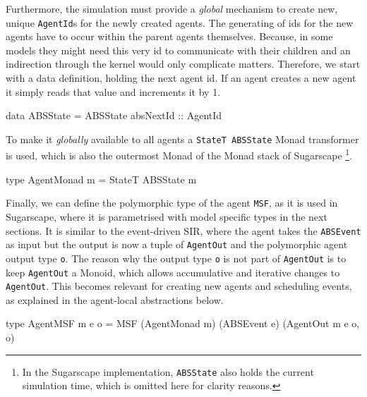 Furthermore, the simulation must provide a \textit{global} mechanism to create new, unique \texttt{AgentId}s for the newly created agents. The generating of ids for the new agents have to occur within the parent agents themselves. Because, in some models they might need this very id to communicate with their children and an indirection through the kernel would only complicate matters. Therefore, we start with a data definition, holding the next agent id. If an agent creates a new agent it simply reads that value and increments it by 1.

\begin{HaskellCode}
data ABSState = ABSState { absNextId :: AgentId }
\end{HaskellCode}

To make it \textit{globally} available to all agents a \texttt{StateT ABSState} Monad transformer is used, which is also the outermost Monad of the Monad stack of Sugarscape \footnote{In the Sugarscape implementation, \texttt{ABSState} also holds the current simulation time, which is omitted here for clarity reasons.}.

\begin{HaskellCode}
type AgentMonad m = StateT ABSState m
\end{HaskellCode}

Finally, we can define the polymorphic type of the agent \texttt{MSF}, as it is used in Sugarscape, where it is parametrised with model specific types in the next sections. It is similar to the event-driven SIR, where the agent takes the \texttt{ABSEvent} as input but the output is now a tuple of \texttt{AgentOut} and the polymorphic agent output type \texttt{o}. The reason why the output type \texttt{o} is not part of \texttt{AgentOut} is to keep \texttt{AgentOut} a Monoid, which allows accumulative and iterative changes to \texttt{AgentOut}. This becomes relevant for creating new agents and scheduling events, as explained in the agent-local abstractions below.

\begin{HaskellCode}
type AgentMSF m e o = MSF (AgentMonad m) (ABSEvent e) (AgentOut m e o, o)
\end{HaskellCode}
